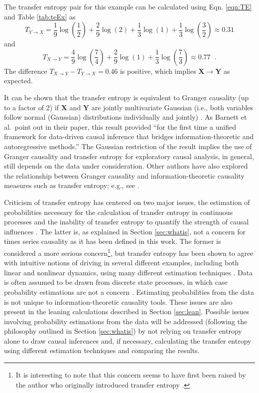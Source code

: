 The transfer entropy pair for this example can be calculated using Eqn. \ref{eqn:TE} and Table \ref{tab:teEx} as
\begin{equation}
T_{Y\rightarrow X} = \frac{1}{9}\log\left(\frac{1}{2}\right)+\frac{2}{9}\log\left(2\right)+\frac{1}{3}\log\left(1\right)+\frac{1}{3}\log\left(\frac{3}{2}\right) \approx 0.31
\end{equation}
and
\begin{equation}
T_{X\rightarrow Y} =  \frac{4}{9}\log\left(\frac{7}{4}\right)+\frac{2}{9}\log\left(1\right)+\frac{1}{3}\log\left(\frac{7}{3}\right) \approx 0.77 \;\;.
\end{equation}
The difference $T_{X\rightarrow Y}-T_{Y\rightarrow X} = 0.46$ is positive, which implies $\mathbf{X}\rightarrow\mathbf{Y}$ as expected.

It can be shown that the transfer entropy is equivalent to Granger causality (up to a factor of 2) if $\mathbf{X}$ and $\mathbf{Y}$ are jointly multivariate Gaussian (i.e., both variables follow normal (Gaussian) distributions individually and jointly) \cite{Barnett2009}.  As Barnett et al.\ point out in their paper, this result provided ``for the first time a unified framework for data-driven causal inference that bridges information-theoretic and autoregressive methods.''  The Gaussian restriction of the result implies the use of Granger causality and transfer entropy for exploratory causal analysis, in general, still depends on the data under consideration.  Other authors have also explored the relationship between Granger causality and information-theoretic causality measures such as transfer entropy; e.g., see \cite{Amblard2012,Lungarella2007}.

Criticism of transfer entropy has centered on two major issues, the estimation of probabilities necessary for the calculation of transfer entropy in continuous processes \cite{Kaiser2002} and the inability of transfer entropy to quantify the strength of causal influences \cite{Janzing2013}.  The latter is, as explained in Section \ref{sec:whatis}, not a concern for times series causality as it has been defined in this work.  The former is considered a more serious concern\footnote{It is interesting to note that this concern seems to have first been raised by the author who originally introduced transfer entropy \cite{Kaiser2002}.}, but transfer entropy has been shown to agree with intuitive notions of driving in several different examples, including both linear and nonlinear dynamics, using many different estimation techniques \cite{Kaiser2002,Nichols2006}.  Data is often assumed to be drawn from discrete state processes, in which case probability estimations are not a concern \cite{Kaiser2002}.  Estimating probabilities from the data is not unique to information-theoretic causality tools.  These issues are also present in the leaning calculations described in Section \ref{sec:lean}.  Possible issues involving probability estimations from the data will be addressed (following the philosophy outlined in Section \ref{sec:whatis}) by not relying on transfer entropy alone to draw causal inferences and, if necessary, calculating the transfer entropy using different estimation techniques and comparing the results.  

